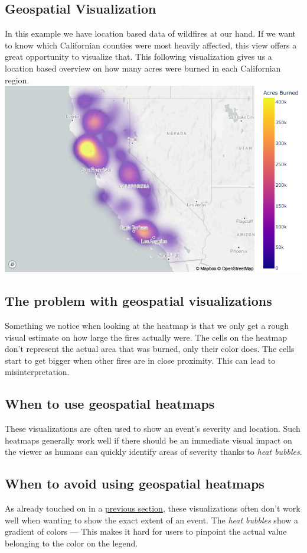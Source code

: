 \begin{multicols}{2}
\section*{Geospatial Visualization}
In this example we have location based data of wildfires at our hand. If we want to know which Californian counties were most heavily affected, this view offers a great opportunity to visualize that. This following visualization gives us a location based overview on how many acres were burned in each Californian region.
\includegraphics[width=\columnwidth]{Images/figures/heatmap_1.png}
\label{fig:Heatmap}
\subsection*{The problem with geospatial visualizations}\label{sec:Problem with geospatial}
Something we notice when looking at the heatmap is that we only get a rough visual estimate on how large the fires actually were. The cells on the heatmap don't represent the actual area that was burned, only their color does. The cells start to get bigger when other fires are in close proximity. This can lead to misinterpretation.

\subsection*{When to use geospatial heatmaps}
These visualizations are often used to show an event's severity and location. Such heatmaps generally work well if there should be an immediate visual impact on the viewer as humans can quickly identify areas of severity thanks to \textit{heat bubbles}.

\subsection*{When to avoid using geospatial heatmaps}
As already touched on in a \hyperref[sec:Problem with geospatial]{previous section}, these visualizations often don't work well when wanting to show the exact extent of an event. The \textit{heat bubbles} show a gradient of colors --- This makes it hard for users to pinpoint the actual value belonging to the color on the legend.


\end{multicols}
